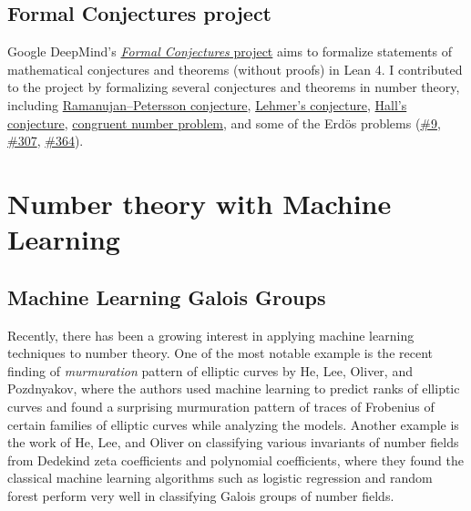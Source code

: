 \documentclass[letterpaper, 10pt]{article}
\begin{document}
\subsection{Formal Conjectures project}

Google DeepMind's \href{https://github.com/google-deepmind/formal-conjectures}{\emph{Formal Conjectures} project} aims to formalize statements of mathematical conjectures and theorems (without proofs) in Lean 4.
I contributed to the project by formalizing several conjectures and theorems in number theory, including \href{https://github.com/google-deepmind/formal-conjectures/pull/119}{Ramanujan--Petersson conjecture}, \href{https://github.com/google-deepmind/formal-conjectures/pull/139}{Lehmer's conjecture}, \href{https://github.com/google-deepmind/formal-conjectures/issues/184}{Hall's conjecture}, \href{https://github.com/google-deepmind/formal-conjectures/pull/317}{congruent number problem}, and some of the Erd\"os problems (\href{https://github.com/google-deepmind/formal-conjectures/pull/300}{\#9}, \href{https://github.com/google-deepmind/formal-conjectures/pull/301}{\#307}, \href{https://github.com/google-deepmind/formal-conjectures/pull/449}{\#364}).


\section{Number theory with Machine Learning}

\subsection{Machine Learning Galois Groups}

Recently, there has been a growing interest in applying machine learning techniques to number theory.
One of the most notable example is the recent finding of \emph{murmuration} pattern of elliptic curves \cite{he2024murmurations} by He, Lee, Oliver, and Pozdnyakov, where the authors used machine learning to predict ranks of elliptic curves and found a surprising murmuration pattern of traces of Frobenius of certain families of elliptic curves while analyzing the models.
Another example is the work of He, Lee, and Oliver \cite{he2020machine} on classifying various invariants of number fields from Dedekind zeta coefficients and polynomial coefficients, where they found the classical machine learning algorithms such as logistic regression and random forest perform very well in classifying Galois groups of number fields.
\end{document}
